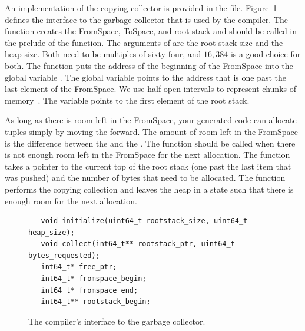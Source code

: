 \documentclass[7x10]{TimesAPriori_MIT}%
\numberwithin{theorem}{chapter}
\numberwithin{definition}{chapter}
\numberwithin{equation}{chapter}
\begin{document}
An implementation of the copying collector is provided in the
 file. Figure~\ref{fig:gc-header} defines the
interface to the garbage collector that is used by the compiler. The
 function creates the FromSpace, ToSpace, and root
stack and should be called in the prelude of the 
function. The arguments of  are the root stack size
and the heap size. Both need to be multiples of sixty-four, and $16,384$ is a
good choice for both.  The  function puts the address
of the beginning of the FromSpace into the global variable
. The global variable  points to
the address that is one past the last element of the FromSpace. We use
half-open intervals to represent chunks of
memory~\citep{Dijkstra:1982aa}.  The  variable
points to the first element of the root stack.

As long as there is room left in the FromSpace, your generated code
can allocate tuples simply by moving the
 forward.
%
The amount of room left in the FromSpace is the difference between the
 and the .  The 
function should be called when there is not enough room left in the
FromSpace for the next allocation.  The  function takes
a pointer to the current top of the root stack (one past the last item
that was pushed) and the number of bytes that need to be
allocated. The  function performs the copying collection
and leaves the heap in a state such that there is enough room for the
next allocation.

\begin{figure}[tbp]
  \begin{tcolorbox}[colback=white]
    \begin{lstlisting}
   void initialize(uint64_t rootstack_size, uint64_t heap_size);
   void collect(int64_t** rootstack_ptr, uint64_t bytes_requested);
   int64_t* free_ptr;
   int64_t* fromspace_begin;
   int64_t* fromspace_end;
   int64_t** rootstack_begin;
\end{lstlisting}
 \end{tcolorbox}
 \caption{The compiler's interface to the garbage collector.}
\label{fig:gc-header}
\end{figure}
\end{document}
